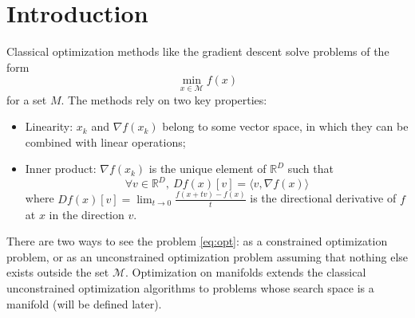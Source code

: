 \documentclass[12pt, openany]{report}
\newcommand{\R}{\mathbb{R}}
\newcommand{\M}{\mathcal{M}}
\theoremstyle{definition}
\begin{document}
\section{Introduction}
Classical optimization methods like the gradient descent solve problems of the form 
\begin{equation}\label{eq:opt}
	\min_{x\in \M} f(x)
\end{equation}
for a set $M$. The methods rely on two key properties:
\begin{itemize}
	\item Linearity: $x_k$ and $\nabla f(x_k)$ belong to some vector space, in which they can be combined with linear operations;
	\item Inner product: $\nabla f(x_k)$ is the unique element of $\R^D$ such that 
	\begin{equation}
		\forall v\in \R^D, \: Df(x)[v] = \langle v, \nabla f(x)\rangle 
	\end{equation}
	where $Df(x)[v] = \lim_{t\to 0} \frac{f(x+tv) - f(x)}{t}$ is the directional derivative of $f$ at $x$ in the direction $v$.
\end{itemize}
There are two ways to see the problem \ref{eq:opt}: as a constrained optimization problem, or as an unconstrained optimization problem assuming that nothing else exists outside the set $\M$. Optimization on manifolds extends the classical unconstrained optimization algorithms to problems whose search space is a manifold (will be defined later).
\end{document}
